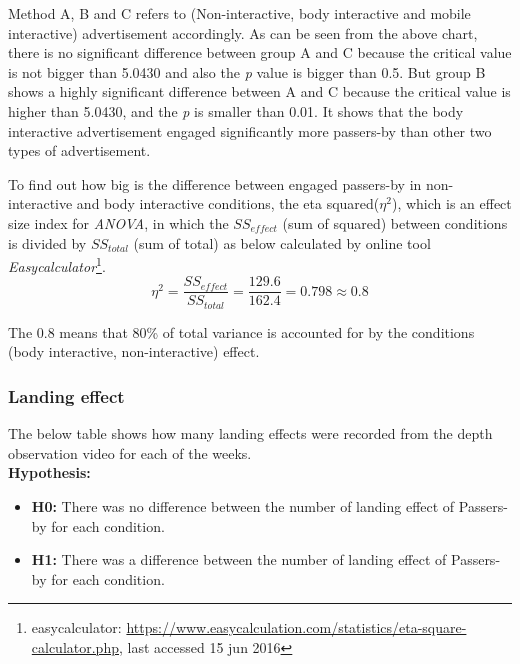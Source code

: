 Method A, B and C refers to (Non-interactive, body interactive and mobile interactive) advertisement accordingly. As can be seen from the above chart, there is no significant difference between group A and C because the critical value is not bigger than 5.0430 and also the \emph{p} value is bigger than 0.5. But group B shows a highly significant difference between A and C because the critical value is higher than 5.0430, and the \emph{p} is smaller than 0.01. It shows that the body interactive advertisement engaged significantly more passers-by than other two types of advertisement.

To find out how big is the difference between engaged passers-by in non-interactive and body interactive conditions, the eta squared(${\eta}^2$), which is an effect size index for \emph{ANOVA}, in which the $SS_{effect}$ (sum of squared) between conditions is divided by $SS_{total}$  (sum of total) as below calculated by online tool \emph{Easycalculator}\footnote{easycalculator: \url{https://www.easycalculation.com/statistics/eta-square-calculator.php}, last accessed 15 jun 2016}.
\[
{\eta}^2 = \frac{{SS}_{effect}}{{SS}_{total}} = \frac{129.6}{162.4} = 0.798 \approx 0.8
\]

The 0.8 means that 80\% of total variance is accounted for by the conditions (body interactive, non-interactive) effect. 


\subsubsection {Landing effect}
The below table shows how many landing effects were recorded from the depth observation video for each of the weeks.\\


\textbf{Hypothesis: }
\begin{itemize}
\item \textbf{H0:} There was no difference between the number of landing effect of Passers-by for each condition.
\item \textbf{H1:} There was a difference between the number of landing effect of Passers-by for each condition.
\end{itemize}

\begin{table}[H]
\caption{Number of Landing effect in three weeks}
\label{tab:landingeffectthreeweeks}
\centering
{}
\end{table}

